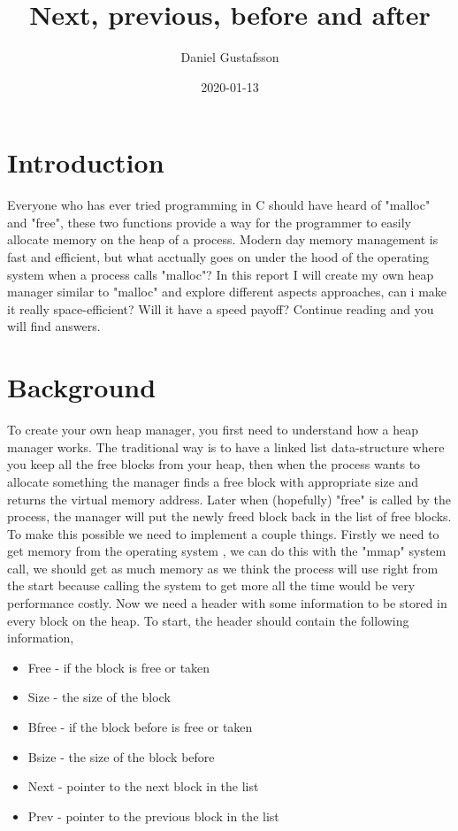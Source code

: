 \documentclass[11pt]{article}
\title{Next, previous, before and after}
\date{2020-01-13}
\author{Daniel Gustafsson}
\begin{document}
\maketitle
{}

\newpage
{}

\section{Introduction}

Everyone who has ever tried programming in C should have heard of "malloc" and "free", these two functions provide a way for the programmer to easily
allocate memory on the heap of a process. Modern day memory management is fast and efficient, but what acctually goes on under the hood of the
operating system when a process calls "malloc"? In this report I will create my own heap manager similar to "malloc" and explore different aspects 
approaches, can i make it really space-efficient? Will it have a speed payoff? Continue reading and you will find answers.

\section{Background}

To create your own heap manager, you first need to understand how a heap manager works. The traditional way is to have a linked list data-structure 
where you keep all the free blocks from your heap, then when the process wants to allocate something the manager finds a free block with appropriate
size and returns the virtual memory address. Later when (hopefully) "free" is called by the process, the manager will put the newly freed block 
back in the list of free blocks. To make this possible we need to implement a couple things. Firstly we need to get memory from the operating system
, we can do this with the "mmap" system call, we should get as much memory as we think the process will use right from the start because 
calling the system to get more all the time would be very performance costly. Now we need a header with some information to be stored in every block
on the heap. To start, the header should contain the following information,
\begin{itemize}
    \item Free - if the block is free or taken
    \item Size - the size of the block
    \item Bfree - if the block before is free or taken
    \item Bsize - the size of the block before
    \item Next - pointer to the next block in the list
    \item Prev - pointer to the previous block in the list
\end{itemize}
\end{document}
